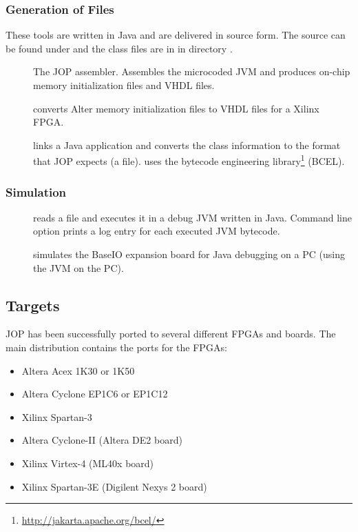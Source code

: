 \subsubsection{Generation of Files}

These tools are written in Java and are delivered in source form.
The source can be found under  and the class
files are in  in directory
.

\begin{description}
    \item[] The JOP assembler. Assembles the microcoded
    JVM and produces on-chip memory initialization files and VHDL
    files.
    \item[] converts Alter memory initialization files
    to VHDL files for a Xilinx FPGA.
    \item[] links a Java application and converts the
    class information to the format that JOP expects (a  file).
     uses the bytecode engineering library\footnote{\url{http://jakarta.apache.org/bcel/}} (BCEL).

\end{description}

\subsubsection{Simulation}

\begin{description}
    \item[] reads a  file and executes it in
    a debug JVM written in Java. Command line option
     prints a log entry for each executed JVM
    bytecode.
    \item[] simulates the BaseIO expansion board for Java
    debugging on a PC (using the JVM on the PC).
\end{description}

\subsection{Targets}

JOP has been successfully ported to several different FPGAs and
boards. The main distribution contains the ports for the FPGAs:

\begin{itemize}
    \item Altera Acex 1K30 or 1K50
    \item Altera Cyclone EP1C6 or EP1C12
    \item Xilinx Spartan-3
    \item Altera Cyclone-II (Altera DE2 board)
    \item Xilinx Virtex-4 (ML40x board)
    \item Xilinx Spartan-3E (Digilent Nexys 2 board)
\end{itemize}

